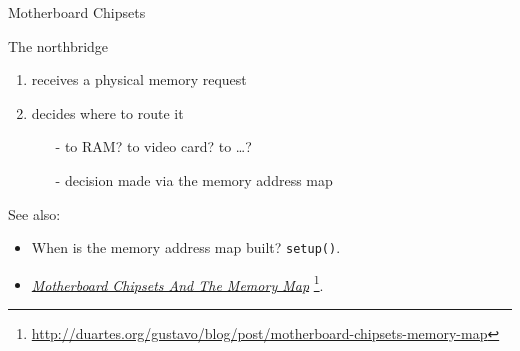 \begin{frame}
  \begin{center}
  \end{center}
\end{frame}

\begin{frame}{Motherboard Chipsets}
  \begin{center}
  \end{center}
  \begin{block}{The northbridge}
    \begin{enumerate}
    \item receives a physical memory request
    \item decides where to route it
      \begin{itemize}
      \item[-] to RAM? to video card? to \ldots{}?
      \item[-] decision made via the \alert{memory address map}
      \end{itemize}
    \end{enumerate}
  \end{block}
\end{frame}

See also:
\begin{itemize}
\item When is the memory address map built? \texttt{setup()}.
\item
  \href{http://duartes.org/gustavo/blog/post/motherboard-chipsets-memory-map}{\emph{Motherboard
      Chipsets And The Memory Map}}
  \footnote{\url{http://duartes.org/gustavo/blog/post/motherboard-chipsets-memory-map}}.
\end{itemize}


